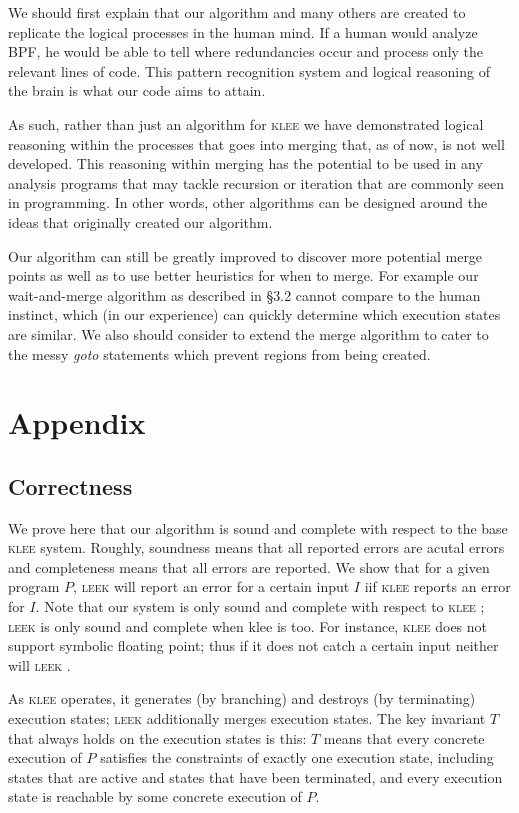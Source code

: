 \documentclass[12pt,a4paper]{article}
\newcommand{\klee}{\textsc{klee }}
\newcommand{\leek}{\textsc{leek }}
\begin{document}
We should first explain that our algorithm and many others are created to replicate the logical processes in the human mind. If a human would analyze BPF, he would be able to tell where redundancies occur and process only the relevant lines of code. This pattern recognition system and logical reasoning of the brain is what our code aims to attain.

As such, rather than just an algorithm for \klee we have demonstrated logical reasoning within the processes that goes into merging that, as of now, is not well developed. This reasoning within merging has the potential to be used in any analysis programs that may tackle recursion or iteration that are commonly seen in programming. In other words, other algorithms can be designed around the ideas that originally created our algorithm.

Our algorithm can still be greatly improved to discover more potential merge points as well as to use better heuristics for when to merge. For example our wait-and-merge algorithm as described in \S 3.2 cannot compare to the human instinct, which (in our experience) can quickly determine which execution states are similar. We also should consider to extend the merge algorithm to cater to the messy \emph{goto} statements which prevent regions from being created. 

\section{Appendix}

\subsection{Correctness}

We prove here that our algorithm is sound and complete with respect to the base \klee system. Roughly, soundness means that all reported errors are acutal errors and completeness means that all errors are reported. We show that for a given program $P$, \leek will report an error for a certain input $I$ iif \klee reports an error for $I$. Note that our system is only sound and complete with respect to \klee; \leek is only sound and complete when klee is too. For instance, \klee does not support symbolic floating point; thus if it does not catch a certain input neither will \leek.

As \klee operates, it generates (by branching) and destroys (by terminating) execution states; \leek additionally merges execution states. The key invariant $T$ that always holds on the execution states is this: $T$ means that every concrete execution of $P$ satisfies the constraints of exactly one execution state, including states that are active and states that have been terminated, and every execution state is reachable by some concrete execution of $P$.
\end{document}
